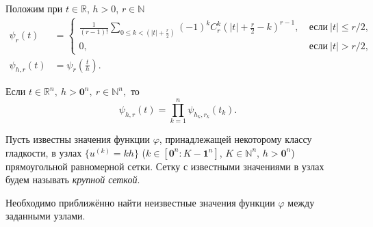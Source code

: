 
Положим при $t\in\mathbb{R}$, $h>0$, $r\in\mathbb{N}$
\begin{align*}
  \psi_r(t)&=
  \begin{cases}
    \frac{1}{(r-1)!}\sum\limits_{0\leqslant k<\left(|t|+\frac{r}{2}\right)}(-1)^kC_r^k\left(|t|+\frac{r}{2}-k\right)^{r-1},
    &\ \text{если}\ |t|\leqslant r/2,\\
    0,&\ \text{если}\ |t| > r/2,
  \end{cases}\\
  \psi_{h,r}(t)&=\psi_r\left(\frac{t}{h}\right).
\end{align*}

Если $t\in\mathbb{R}^n,\  h>\mathbf{0}^n,\ r\in\mathbb{N}^n,$ то
\begin{equation*}
  \psi_{h,r}(t)=\prod_{k=1}^n\psi_{h_k,r_k}(t_k).
\end{equation*}


Пусть известны значения  функции $\varphi$, принадлежащей некоторому классу гладкости, 
в  узлах $\{u^{(k)}=kh\}$ ($k\in [\mathbf{0}^n : K-\mathbf{1}^n]$, $K\in \mathbb{N}^n$,
$h>\mathbf{0}^n$) прямоугольной
равномерной сетки. 
Сетку с известными значениями в узлах будем называть \textit{крупной сеткой}.

Необходимо приближённо найти неизвестные значения
функции $\varphi$ между заданными узлами.

